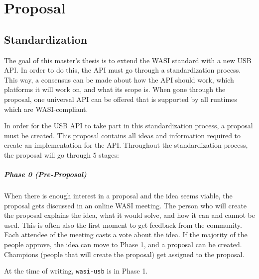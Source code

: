 \chapter{Proposal}

\section{Standardization}
The goal of this master's thesis is to extend the WASI standard with a new USB API. In order to do this, the API must go through a standardization process. This way, a consensus can be made about how the API should work, which platforms it will work on, and what its scope is. When gone through the proposal, one universal API can be offered that is supported by all runtimes which are WASI-compliant.

In order for the USB API to take part in this standardization process, a proposal must be created. This proposal contains all ideas and information required to create an implementation for the API. Throughout the standardization process, the proposal will go through 5 stages:

\paragraph{Phase 0 (Pre-Proposal)}
When there is enough interest in a proposal and the idea seems viable, the proposal gets discussed in an online WASI meeting. The person who will create the proposal explains the idea, what it would solve, and how it can and cannot be used. This is often also the first moment to get feedback from the community. Each attendee of the meeting casts a vote about the idea. If the majority of the people approve, the idea can move to Phase 1, and a proposal can be created. Champions (people that will create the proposal) get assigned to the proposal.

At the time of writing, \texttt{wasi-usb} is in Phase 1.

